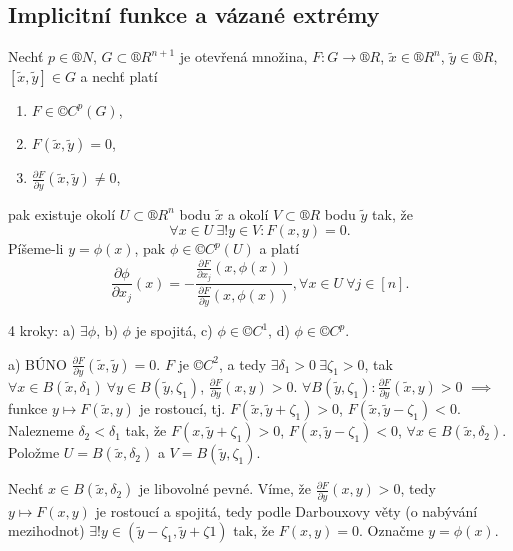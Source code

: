 \documentclass[12pt]{article}					%
\begin{document}
	\subsection{Implicitní funkce a vázané extrémy}
	\begin{veta}
		Nechť $p \in ®N$, $G \subset ®R^{n+1}$ je otevřená množina, $F: G \rightarrow ®R$, $\tilde{x} \in ®R^n$, $\tilde{y} \in ®R$, $[\tilde{x}, \tilde{y}] \in G$ a nechť platí

		\begin{enumerate}
			\item $F \in ©C^p(G)$,
			\item $F(\tilde{x}, \tilde{y}) = 0$,
			\item $\frac{\partial F}{\partial y}(\tilde{x}, \tilde{y}) ≠ 0$,
		\end{enumerate}

		pak existuje okolí $U \subset ®R^n$ bodu $\tilde{x}$ a okolí $V \subset ®R$ bodu $\tilde{y}$ tak, že
		$$ \forall x \in U\ \exists! y \in V: F(x, y) = 0. $$
		Píšeme-li $y = \phi(x)$, pak $\phi \in ©C^p(U)$ a platí
		$$ \frac{\partial \phi}{\partial x_j}(x) = - \frac{\frac{\partial F}{\partial x_j}(x, \phi(x))}{\frac{\partial F}{\partial y}(x, \phi(x))}, \forall x \in U\ \forall j \in [n]. $$


		\begin{dukazin}
			4 kroky: a) $\exists \phi$, b) $\phi$ je spojitá, c) $\phi \in ©C^1$, d) $\phi \in ©C^p$.

			a) BÚNO $\frac{\partial F}{\partial y}(\tilde{x}, \tilde{y}) = 0$. $F$ je $©C^2$, a tedy $\exists \delta_1 > 0\ \exists \zeta_1 > 0$, tak $\forall x \in B(\tilde{x}, \delta_1)\ \forall y \in B(\tilde{y}, \zeta_1)$, $\frac{\partial F}{\partial y}(x, y) > 0$. $\forall B(\tilde{y}, \zeta_1): \frac{\partial F}{\partial y}(\tilde{x}, y) > 0$ $\implies$ funkce $y \mapsto F(\tilde{x}, y)$ je rostoucí, tj. $F(\tilde{x}, \tilde{y} + \zeta_1) > 0$, $F(\tilde{x}, \tilde{y} - \zeta_1) < 0$. Nalezneme $\delta_2 < \delta_1$ tak, že $F(x, \tilde{y} + \zeta_1) > 0$, $F(x, \tilde{y} - \zeta_1) < 0$, $\forall x \in B(\tilde{x}, \delta_2)$. Položme $U = B(\tilde{x}, \delta_2)$ a $V = B(\tilde{y}, \zeta_1)$.

			Nechť $x \in B(\tilde{x}, \delta_2)$ je libovolné pevné. Víme, že $\frac{\partial F}{\partial y}(x, y) > 0$, tedy $y \mapsto F(x, y)$ je rostoucí a spojitá, tedy podle Darbouxovy věty (o nabývání mezihodnot) $\exists! y \in (\tilde{y} - \zeta_1, \tilde{y} + \zeta 1)$ tak, že $F(x, y) = 0$. Označme $y = \phi(x)$.


\end{dukazin}
\end{veta}
\end{document}
